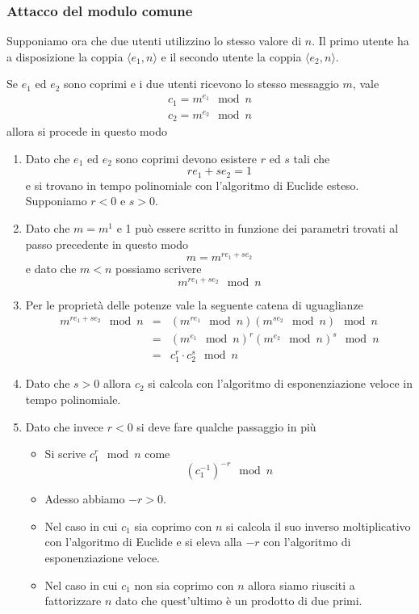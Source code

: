 \subsubsection{Attacco del modulo comune}
Supponiamo ora che due utenti utilizzino lo stesso valore di $n$. Il primo utente ha a disposizione la coppia
$\langle e_1, n \rangle$ e il secondo utente la coppia $\langle e_2, n \rangle$.

Se $e_1$ ed $e_2$ sono coprimi e i due utenti ricevono lo stesso messaggio $m$, vale
\[
	\begin{matrix}
		c_1 = m^{e_1} \mod{n} \\
		c_2 = m^{e_2} \mod{n}
	\end{matrix}
\]
allora si procede in questo modo
\begin{enumerate}
	\item Dato che $e_1$ ed $e_2$ sono coprimi devono esistere $r$ ed $s$ tali che
	      \[ r e_1 + s e_2 = 1 \]
	      e si trovano in tempo polinomiale con l'algoritmo di Euclide esteso. Supponiamo $r < 0$ e $s > 0$.
	\item Dato che $m = m^1$ e 1 pu\`o essere scritto in funzione dei parametri trovati al passo precedente in
	      questo modo
	      \[ m = m^{r e_1 + s e_2} \]
	      e dato che $m < n$ possiamo scrivere
	      \[ m^{r e_1 + s e_2} \mod{n} \]
	\item Per le propriet\`a delle potenze vale la seguente catena di uguaglianze
	      \[
		      \begin{array}{rcl}
			      m^{r e_1 + s e_2} \mod{n} & = & (m^{r e_1} \mod{n}) (m^{s e_2} \mod{n}) \mod{n} \\
			                                & = & (m^{e_1} \mod{n})^r (m^{e_2} \mod{n})^s \mod{n} \\
			                                & = & c_1^r \cdot c_2^s \mod{n}
		      \end{array}
	      \]
	\item Dato che $s > 0$ allora $c_2$ si calcola con l'algoritmo di esponenziazione veloce in tempo polinomiale.
	\item Dato che invece $r < 0$ si deve fare qualche passaggio in pi\`u
	      \begin{itemize}
		      \item Si scrive $c_1^r \mod{n}$ come
		            \[ (c_1^{-1})^{-r} \mod{n} \]
		      \item Adesso abbiamo $-r > 0$.
		      \item Nel caso in cui $c_1$ sia coprimo con $n$ si calcola il suo inverso moltiplicativo con
		            l'algoritmo di Euclide e si eleva alla $-r$ con l'algoritmo di esponenziazione veloce.
		      \item Nel caso in cui $c_1$ non sia coprimo con $n$ allora siamo riusciti a fattorizzare $n$ dato
		            che quest'ultimo \`e un prodotto di due primi.
	      \end{itemize}
\end{enumerate}

